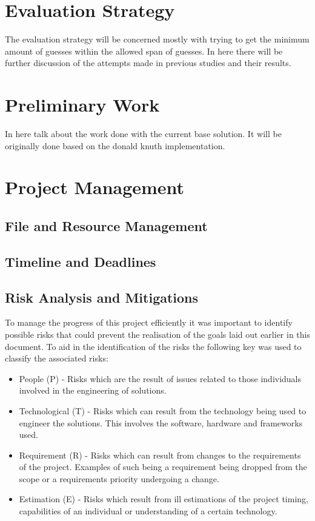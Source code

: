 \documentclass[12pt]{article}  %
\theoremstyle{definition}
\theoremstyle{remark}
\begin{document}
\section{Evaluation Strategy}\label{ss:back}

The evaluation strategy will be concerned mostly with trying to get the minimum amount of guesses within the allowed span of guesses.
In here there will be further discussion of the attempts made in previous studies and their results.

\newpage
\section {Preliminary Work}

In here talk about the work done with the current base solution. It will be originally done based on the donald knuth implementation.


\newpage                     %
\section{Project Management}\label{ss:back}

\subsection {File and Resource Management}

\subsection {Timeline and Deadlines}

\subsection {Risk Analysis and Mitigations}

To manage the progress of this project efficiently it was important to identify possible risks that could prevent the realisation of the goals laid out earlier in this document. To aid in the identification of the risks the following key was used to classify the associated risks:
\begin{itemize}
\item{People (P) - Risks which are the result of issues related to those individuals involved in the engineering of solutions.}
\item{Technological (T) - Risks which can result from the technology being used to engineer the solutions. This involves the software, hardware and frameworks used.}
\item{Requirement (R)  - Risks which can result from changes to the requirements of the project. Examples of such being a requirement being dropped from the scope or a requirements priority undergoing a change.}
\item{Estimation (E) - Risks which result from ill estimations of the project timing, capabilities of an individual or understanding of a certain technology.}
\end{itemize}
\end{document}
